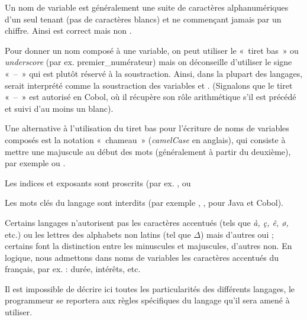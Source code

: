 			\begin{liste}
			\item 
				Un nom de variable est généralement une suite de caractères
				alphanumériques d’un seul tenant (pas de caractères blancs) et ne
				commençant jamais par un chiffre. Ainsi  est
				correct mais non . 
			\item 
				Pour donner un nom composé à une variable, on peut utiliser le «~tiret
				bas~» ou \textit{underscore} (par ex. premier\_numérateur) mais on
				déconseille d’utiliser le signe «~–~» qui est plutôt réservé à la
				soustraction. Ainsi, dans la plupart des langages,
				 serait interprété comme la
				soustraction des variables  et
				. (Signalons que le tiret 
				\textcolor{black}{«~–~»} est autorisé en Cobol, où il récupère son rôle
				arithmétique s’il est précédé et suivi d’au moins un blanc).
			\item 
				Une alternative à l’utilisation du tiret bas pour l’écriture de noms de
				variables composés est la notation «~chameau~» (\textit{camelCase} en
				anglais), qui consiste à mettre une majuscule au début des mots
				(généralement à partir du deuxième), par exemple
				 ou
				.
			\item
				Les indices et exposants sont proscrits (par ex.
				,
				 ou
			\item
				Les mots clés du langage sont interdits (par exemple
				, , pour
				Java et Cobol).
			\item
				Certains langages n’autorisent pas les caractères accentués (tels que
				\textit{à, ç, ê, ø,} etc.) ou les lettres des alphabets non latins
				(tel que ${\Delta}$) mais d’autres oui ; certains font la distinction
				entre les minuscules et majuscules, d’autres non. En logique, nous
				admettons dans noms de variables les caractères accentués du français,
				par ex. : durée, intérêts, etc.
			\end{liste}

			Il est impossible de décrire ici toutes les particularités des
			différents langages, le programmeur se reportera aux règles spécifiques
			du langage qu’il sera amené à utiliser.

